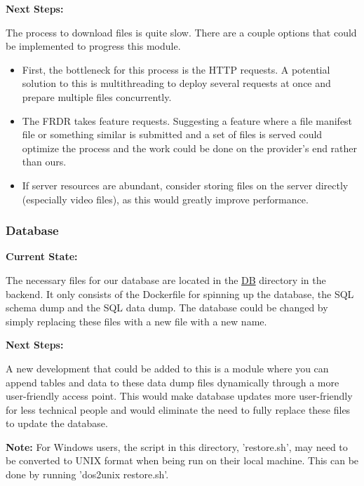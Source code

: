 \documentclass{article}
\begin{document}
\par{\textbf{Next Steps:}}
\par{The process to download files is quite slow. There are a couple options that could be implemented to progress this module.}
\begin{itemize}
  \item{First, the bottleneck for this process is the HTTP requests. A potential solution to this is multithreading to deploy several requests at once 
  and prepare multiple files concurrently.}
  \item{The FRDR takes feature requests. Suggesting a feature where a file manifest file or something similar is submitted and a set of files is served
  could optimize the process and the work could be done on the provider's end rather than ours.}
  \item{If server resources are abundant, consider storing files on the server directly (especially video files), as this would greatly improve performance.}
\end{itemize}

\subsubsection{Database}

\par{\textbf{Current State:}}
\par{The necessary files for our database are located in the \href{https://github.com/OCD-Rats-Capstone/OCD-Rat-Infrastructure/tree/main/src/ocd-rat-backend/db}{DB}
directory in the backend. It only consists of the Dockerfile for spinning up the database, the SQL schema dump and the SQL data dump. The database could be changed
by simply replacing these files with a new file with a new name.}
\newline
\par{\textbf{Next Steps:}}
\par{A new development that could be added to this is a module where you can append tables and data to these data dump files dynamically through a more
user-friendly access point. This would make database updates more user-friendly for less technical people and would eliminate the need to fully replace these
files to update the database.}
\newline
\par{\textbf{Note: }For Windows users, the script in this directory, 'restore.sh', may need to be converted to UNIX format when being run on their local machine.
This can be done by running 'dos2unix restore.sh'.}
\end{document}
